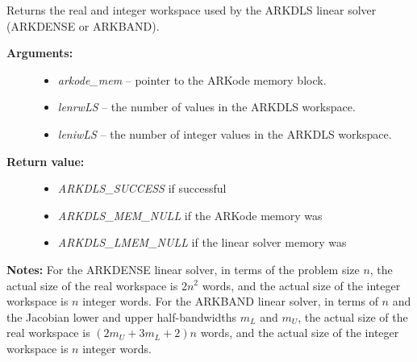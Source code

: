 \documentclass[letterpaper,10pt,english]{sphinxmanual}
\begin{document}
\begin{fulllineitems}
\label{c_interface/User_callable:c.ARKDlsGetWorkSpace}
Returns the real and integer workspace used by the
ARKDLS linear solver (ARKDENSE or ARKBAND).
\begin{description}
\item[{\textbf{Arguments:}}] \leavevmode\begin{itemize}
\item {} 
\emph{arkode\_mem} -- pointer to the ARKode memory block.

\item {} 
\emph{lenrwLS} -- the number of  values in the ARKDLS workspace.

\item {} 
\emph{leniwLS} -- the number of integer values in the ARKDLS workspace.

\end{itemize}

\item[{\textbf{Return value:}}] \leavevmode\begin{itemize}
\item {} 
\emph{ARKDLS\_SUCCESS} if successful

\item {} 
\emph{ARKDLS\_MEM\_NULL} if the ARKode memory was 

\item {} 
\emph{ARKDLS\_LMEM\_NULL} if the linear solver memory was 

\end{itemize}

\end{description}

\textbf{Notes:} For the ARKDENSE linear solver, in terms of the problem
size \(n\), the actual size of the real workspace is
\(2n^2\)  words, and the actual size of the integer
workspace is \(n\) integer words. For the ARKBAND linear
solver, in terms of \(n\) and the Jacobian lower and upper
half-bandwidths \(m_L\) and \(m_U\), the actual size of the
real workspace is \((2m_U + 3m_L + 2)n\)  words,
and the actual size of the integer workspace is \(n\) integer
words.

\end{fulllineitems}

\end{document}
